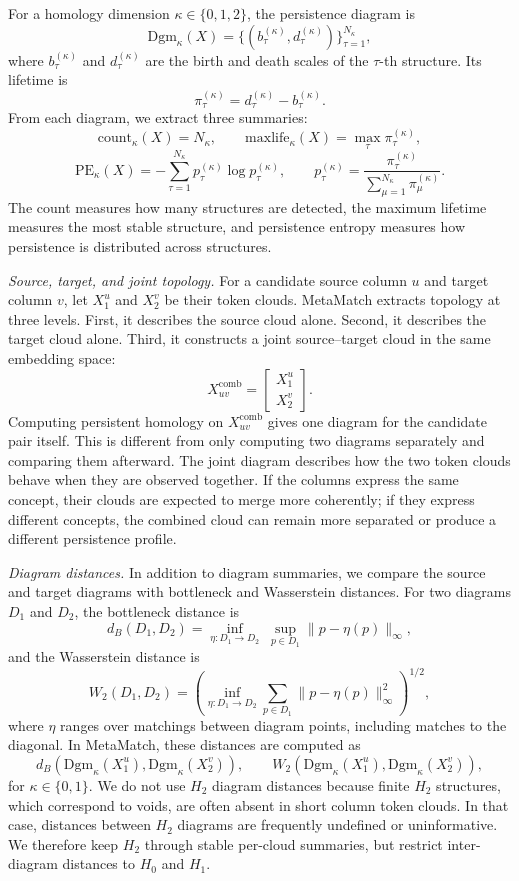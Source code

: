 \documentclass[sigconf, nonacm]{acmart}
\newcommand{\Dgm}{\mathrm{Dgm}}
\newcommand{\PE}{\mathrm{PE}}
\begin{document}
For a homology dimension \(\kappa\in\{0,1,2\}\), the persistence diagram is
\[
\Dgm_{\kappa}(X)=\{(b_{\tau}^{(\kappa)},d_{\tau}^{(\kappa)})\}_{\tau=1}^{N_{\kappa}},
\]
where \(b_{\tau}^{(\kappa)}\) and \(d_{\tau}^{(\kappa)}\) are the birth and death scales of the \(\tau\)-th structure. Its lifetime is
\[
\pi_{\tau}^{(\kappa)}=d_{\tau}^{(\kappa)}-b_{\tau}^{(\kappa)}.
\]
From each diagram, we extract three summaries:
\[
\mathrm{count}_{\kappa}(X)=N_{\kappa},
\qquad
\mathrm{maxlife}_{\kappa}(X)=\max_{\tau}\pi_{\tau}^{(\kappa)},
\]
\[
\PE_{\kappa}(X)=-\sum_{\tau=1}^{N_{\kappa}} p_{\tau}^{(\kappa)}\log p_{\tau}^{(\kappa)},
\qquad
p_{\tau}^{(\kappa)}=\frac{\pi_{\tau}^{(\kappa)}}{\sum_{\mu=1}^{N_{\kappa}}\pi_{\mu}^{(\kappa)}}.
\]
The count measures how many structures are detected, the maximum lifetime measures the most stable structure, and persistence entropy measures how persistence is distributed across structures.

\noindent\textit{Source, target, and joint topology.}
For a candidate source column \(u\) and target column \(v\), let \(X_1^u\) and \(X_2^v\) be their token clouds. MetaMatch extracts topology at three levels. First, it describes the source cloud alone. Second, it describes the target cloud alone. Third, it constructs a joint source--target cloud in the same embedding space:
\[
X_{uv}^{\mathrm{comb}}=
\begin{bmatrix}
X_1^u\\
X_2^v
\end{bmatrix}.
\]
Computing persistent homology on \(X_{uv}^{\mathrm{comb}}\) gives one diagram for the candidate pair itself. This is different from only computing two diagrams separately and comparing them afterward. The joint diagram describes how the two token clouds behave when they are observed together. If the columns express the same concept, their clouds are expected to merge more coherently; if they express different concepts, the combined cloud can remain more separated or produce a different persistence profile.

\noindent\textit{Diagram distances.}
In addition to diagram summaries, we compare the source and target diagrams with bottleneck and Wasserstein distances. For two diagrams \(D_1\) and \(D_2\), the bottleneck distance is
\[
d_B(D_1,D_2)=\inf_{\eta:D_1\to D_2}\;\sup_{p\in D_1}\|p-\eta(p)\|_{\infty},
\]
and the Wasserstein distance is
\[
W_2(D_1,D_2)=
\left(\inf_{\eta:D_1\to D_2}\sum_{p\in D_1}\|p-\eta(p)\|_{\infty}^{2}\right)^{1/2},
\]
where \(\eta\) ranges over matchings between diagram points, including matches to the diagonal. In MetaMatch, these distances are computed as
\[
d_B\!\left(\Dgm_{\kappa}(X_1^u),\Dgm_{\kappa}(X_2^v)\right),
\qquad
W_2\!\left(\Dgm_{\kappa}(X_1^u),\Dgm_{\kappa}(X_2^v)\right),
\]
for \(\kappa\in\{0,1\}\). We do not use \(H_2\) diagram distances because finite \(H_2\) structures, which correspond to voids, are often absent in short column token clouds. In that case, distances between \(H_2\) diagrams are frequently undefined or uninformative. We therefore keep \(H_2\) through stable per-cloud summaries, but restrict inter-diagram distances to \(H_0\) and \(H_1\).
\end{document}
